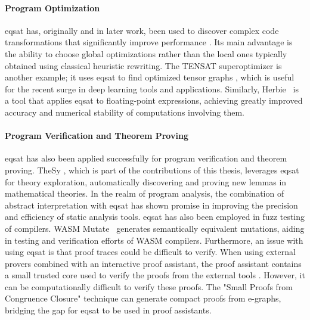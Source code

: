 \paragraph{Program Optimization} \gls{eqsat} has, originally and in later work, been used to discover complex code transformations that significantly improve performance \cite{eqsat}.
Its main advantage is the ability to choose global optimizations rather than the local ones typically obtained using classical heuristic rewriting.
The TENSAT superoptimizer is another example; it uses \gls{eqsat} to find optimized tensor graphs \cite{tensat}, which is useful for the recent surge in deep learning tools and applications.
Similarly, Herbie~\cite{herbie} is a tool that applies \gls{eqsat} to floating-point expressions, achieving greatly improved accuracy and numerical stability of computations involving them.

\paragraph{Program Verification and Theorem Proving}
\gls{eqsat} has also been applied successfully for program verification and theorem proving.
TheSy \cite{thesy}, which is part of the contributions of this thesis, leverages \gls{eqsat} for theory exploration, automatically discovering and proving new lemmas in mathematical theories.
In the realm of program analysis, the combination of abstract interpretation with \gls{eqsat} \cite{abstracteqsat} has shown promise in improving the precision and efficiency of static analysis tools. 
\gls{eqsat} has also been employed in fuzz testing of compilers. 
WASM Mutate~\cite{arteaga2022wasm} generates semantically equivalent mutations, aiding in testing and verification efforts of WASM compilers. 
Furthermore, an issue with using \gls{eqsat} is that proof traces could be difficult to verify. 
When using external provers combined with an interactive proof assistant, the proof assistant contains a small trusted core used to verify the proofs from the external tools \cite{armand2011modular, coqhammer, Coq:manual}.  
However, it can be computationally difficult to verify these proofs.
The "Small Proofs from Congruence Closure" technique \cite{flatt2022small} can generate compact proofs from e-graphs, bridging the gap for \gls{eqsat} to be used in proof assistants.

